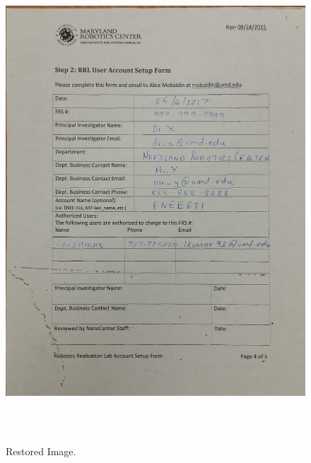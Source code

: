 \begin{figure}[th]
	\centering
	\includegraphics[height=18cm ]{Figures/restored_image}
	\caption[Restored Image]{Restored Image.}
	\label{fig:RestoredImage}
\end{figure}

\pagebreak




